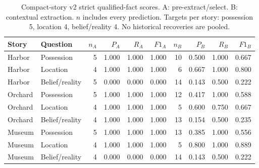 \begin{table}[t]
\vspace*{6pt}
\caption{Compact-story v2 strict qualified-fact scores. A: pre-extract/select. B: contextual extraction. $n$ includes every prediction. Targets per story: possession 5, location 4, belief/reality 4. No historical recoveries are pooled.}\label{tab:compact}
\centering\small
\begin{tabular}{llrrrrrrrr}\toprule
Story & Question & $n_A$ & $P_A$ & $R_A$ & $F1_A$ & $n_B$ & $P_B$ & $R_B$ & $F1_B$\\\midrule
Harbor & Possession & 5 & 1.000 & 1.000 & 1.000 & 10 & 0.500 & 1.000 & 0.667 \\
Harbor & Location & 4 & 1.000 & 1.000 & 1.000 & 6 & 0.667 & 1.000 & 0.800 \\
Harbor & Belief/reality & 5 & 0.000 & 0.000 & 0.000 & 14 & 0.143 & 0.500 & 0.222 \\
Orchard & Possession & 5 & 1.000 & 1.000 & 1.000 & 12 & 0.417 & 1.000 & 0.588 \\
Orchard & Location & 4 & 1.000 & 1.000 & 1.000 & 5 & 0.600 & 0.750 & 0.667 \\
Orchard & Belief/reality & 4 & 1.000 & 1.000 & 1.000 & 13 & 0.154 & 0.500 & 0.235 \\
Museum & Possession & 5 & 1.000 & 1.000 & 1.000 & 13 & 0.385 & 1.000 & 0.556 \\
Museum & Location & 4 & 1.000 & 1.000 & 1.000 & 5 & 0.800 & 1.000 & 0.889 \\
Museum & Belief/reality & 4 & 0.000 & 0.000 & 0.000 & 14 & 0.143 & 0.500 & 0.222 \\\bottomrule\end{tabular}\end{table}
